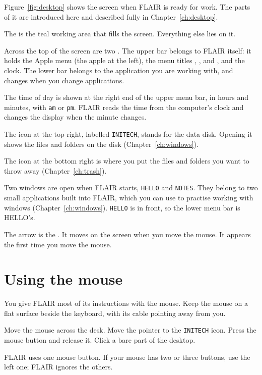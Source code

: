 
Figure~\ref{fig:desktop} shows the screen when FLAIR is ready for work.
The parts of it are introduced here and described fully in Chapter~\ref{ch:desktop}.

The  is the teal working area that fills
the screen.  Everything else lies on it.

Across the top of the screen are two .
The upper bar belongs to FLAIR itself: it holds the Apple menu (the apple
at the left), the menu titles , ,
 and , and the clock.  The lower bar
belongs to the application you are working with, and changes when you
change applications.

The time of day is shown at the right end of the upper
menu bar, in hours and minutes, with \texttt{am} or \texttt{pm}.  FLAIR
reads the time from the computer's clock and changes the display when the
minute changes.

The icon at the top right, labelled \texttt{INITECH},
stands for the data disk.  Opening it shows the files and folders on the
disk (Chapter~\ref{ch:windows}).

The  icon at the bottom right is where you put
the files and folders you want to throw away (Chapter~\ref{ch:trash}).

Two windows are open when FLAIR starts, \texttt{HELLO}
and \texttt{NOTES}.  They belong to two small applications built into
FLAIR, which you can use to practise working with windows (Chapter~\ref{ch:windows}).
\texttt{HELLO} is in front, so the lower menu bar is HELLO's.

The arrow is the .  It moves on the screen
when you move the mouse.  It appears the first time you move the mouse.

\section{Using the mouse}
You give FLAIR most of its instructions with the mouse.  Keep the mouse on
a flat surface beside the keyboard, with its cable pointing away from you.
\begin{TaskSteps}
\Step Move the mouse across the desk.
\Step Move the pointer to the \texttt{INITECH} icon.
\Step Press the mouse button and release it.
\Step Click a bare part of the desktop.
\end{TaskSteps}
FLAIR uses one mouse button.  If your mouse has two or three buttons, use
the left one; FLAIR ignores the others.

